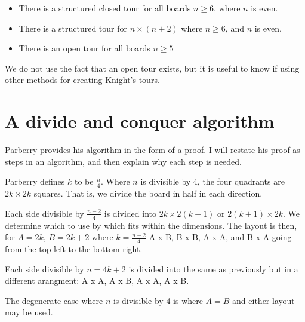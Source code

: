 \documentclass[11pt, a4paper]{article}
\begin{document}
\begin{itemize}
\item There is a structured closed tour for all boards $n \ge 6$, where $n$ is even.
\item There is a structured tour for $n \times (n + 2)$ where $n \ge 6$, and $n$ is even.
\item There is an open tour for all boards $n \ge 5$
\end{itemize}

We do not use the fact that an open tour exists, but it is useful to know if using other methods for creating Knight's tours.

\section{A divide and conquer algorithm}

Parberry provides his algorithm in the form of a proof. I will restate his proof as steps in an algorithm, and then explain why each step is needed.

Parberry defines $k$ to be $\frac{n}{4}$.
Where $n$ is divisible by 4, the four quadrants are $2k \times 2k$ squares. That is, we divide the board in half in each direction.

Each side divisible by $\frac{n - 2}{4}$ is divided into $2k \times 2(k + 1)$ or $2(k + 1) \times 2k$. We determine which to use by which fits within the dimensions. The layout is then, for $A = 2k$, $B = 2k + 2$ where $k = \frac{n - 2}{4}$ A x B, B x B, A x A, and B x A going from the top left to the bottom right.

Each side divisible by $n = 4k + 2$ is divided into the same as previously but in a different arangment: A x A, A x B, A x A, A x B.

The degenerate case where $n$ is divisible by 4 is where $A = B$ and either layout may be used.
\end{document}
